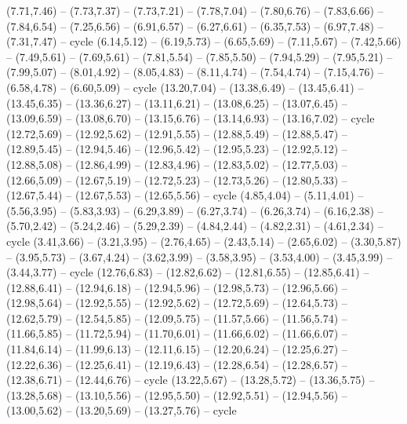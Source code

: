 \expandafter\def\csname geo:gebiet:ND\endcsname{
  (7.71,7.46) -- (7.73,7.37) -- (7.73,7.21) -- (7.78,7.04) -- (7.80,6.76) -- (7.83,6.66) -- (7.84,6.54) -- (7.25,6.56) -- (6.91,6.57) -- (6.27,6.61) -- (6.35,7.53) -- (6.97,7.48) -- (7.31,7.47) -- cycle}
\expandafter\def\csname geo:gebiet:NE\endcsname{
  (6.14,5.12) -- (6.19,5.73) -- (6.65,5.69) -- (7.11,5.67) -- (7.42,5.66) -- (7.49,5.61) -- (7.69,5.61) -- (7.81,5.54) -- (7.85,5.50) -- (7.94,5.29) -- (7.95,5.21) -- (7.99,5.07) -- (8.01,4.92) -- (8.05,4.83) -- (8.11,4.74) -- (7.54,4.74) -- (7.15,4.76) -- (6.58,4.78) -- (6.60,5.09) -- cycle}
\expandafter\def\csname geo:gebiet:NH\endcsname{
  (13.20,7.04) -- (13.38,6.49) -- (13.45,6.41) -- (13.45,6.35) -- (13.36,6.27) -- (13.11,6.21) -- (13.08,6.25) -- (13.07,6.45) -- (13.09,6.59) -- (13.08,6.70) -- (13.15,6.76) -- (13.14,6.93) -- (13.16,7.02) -- cycle}
\expandafter\def\csname geo:gebiet:NJ\endcsname{
  (12.72,5.69) -- (12.92,5.62) -- (12.91,5.55) -- (12.88,5.49) -- (12.88,5.47) -- (12.89,5.45) -- (12.94,5.46) -- (12.96,5.42) -- (12.95,5.23) -- (12.92,5.12) -- (12.88,5.08) -- (12.86,4.99) -- (12.83,4.96) -- (12.83,5.02) -- (12.77,5.03) -- (12.66,5.09) -- (12.67,5.19) -- (12.72,5.23) -- (12.73,5.26) -- (12.80,5.33) -- (12.67,5.44) -- (12.67,5.53) -- (12.65,5.56) -- cycle}
\expandafter\def\csname geo:gebiet:NM\endcsname{
  (4.85,4.04) -- (5.11,4.01) -- (5.56,3.95) -- (5.83,3.93) -- (6.29,3.89) -- (6.27,3.74) -- (6.26,3.74) -- (6.16,2.38) -- (5.70,2.42) -- (5.24,2.46) -- (5.29,2.39) -- (4.84,2.44) -- (4.82,2.31) -- (4.61,2.34) -- cycle}
\expandafter\def\csname geo:gebiet:NV\endcsname{
  (3.41,3.66) -- (3.21,3.95) -- (2.76,4.65) -- (2.43,5.14) -- (2.65,6.02) -- (3.30,5.87) -- (3.95,5.73) -- (3.67,4.24) -- (3.62,3.99) -- (3.58,3.95) -- (3.53,4.00) -- (3.45,3.99) -- (3.44,3.77) -- cycle}
\expandafter\def\csname geo:gebiet:NY\endcsname{
  (12.76,6.83) -- (12.82,6.62) -- (12.81,6.55) -- (12.85,6.41) -- (12.88,6.41) -- (12.94,6.18) -- (12.94,5.96) -- (12.98,5.73) -- (12.96,5.66) -- (12.98,5.64) -- (12.92,5.55) -- (12.92,5.62) -- (12.72,5.69) -- (12.64,5.73) -- (12.62,5.79) -- (12.54,5.85) -- (12.09,5.75) -- (11.57,5.66) -- (11.56,5.74) -- (11.66,5.85) -- (11.72,5.94) -- (11.70,6.01) -- (11.66,6.02) -- (11.66,6.07) -- (11.84,6.14) -- (11.99,6.13) -- (12.11,6.15) -- (12.20,6.24) -- (12.25,6.27) -- (12.22,6.36) -- (12.25,6.41) -- (12.19,6.43) -- (12.28,6.54) -- (12.28,6.57) -- (12.38,6.71) -- (12.44,6.76) -- cycle
  (13.22,5.67) -- (13.28,5.72) -- (13.36,5.75) -- (13.28,5.68) -- (13.10,5.56) -- (12.95,5.50) -- (12.92,5.51) -- (12.94,5.56) -- (13.00,5.62) -- (13.20,5.69) -- (13.27,5.76) -- cycle}
